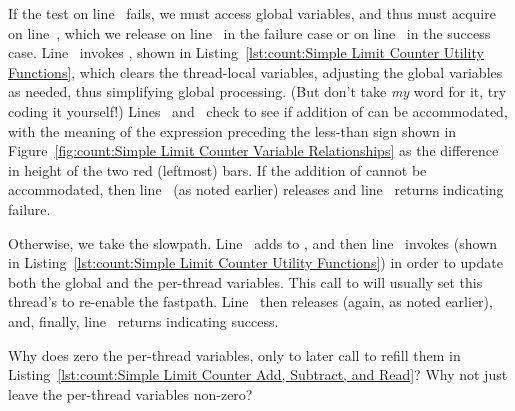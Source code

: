 \begin{lineref}
If the test on
line~ fails, we must access global variables, and thus
must acquire  on
line~, which we release on line~
in the failure case or on line~ in the success case.
Line~ invokes , shown in
Listing~\ref{lst:count:Simple Limit Counter Utility Functions},
which clears the thread-local variables, adjusting the global variables
as needed, thus simplifying global processing.
(But don't take \emph{my} word for it, try coding it yourself!)
Lines~ and~ check to see
if addition of  can be accommodated,
with the meaning of the expression preceding the less-than sign shown in
Figure~\ref{fig:count:Simple Limit Counter Variable Relationships}
as the difference in height of the two red (leftmost) bars.
If the addition of  cannot be accommodated, then
line~ (as noted earlier) releases  and
line~
returns indicating failure.

Otherwise, we take the slowpath.
Line~ adds  to , and then
line~ invokes  (shown in
Listing~\ref{lst:count:Simple Limit Counter Utility Functions})
in order to update both the global and the per-thread variables.
This call to 
will usually set this thread's  to re-enable the fastpath.
Line~ then releases
 (again, as noted earlier), and, finally,
line~ returns indicating success.
\end{lineref}

\QuickQuiz{}
	Why does  zero the per-thread variables,
	only to later call  to refill them in
	Listing~\ref{lst:count:Simple Limit Counter Add, Subtract, and Read}?
	Why not just leave the per-thread variables non-zero?
 \QuickQuizEnd

